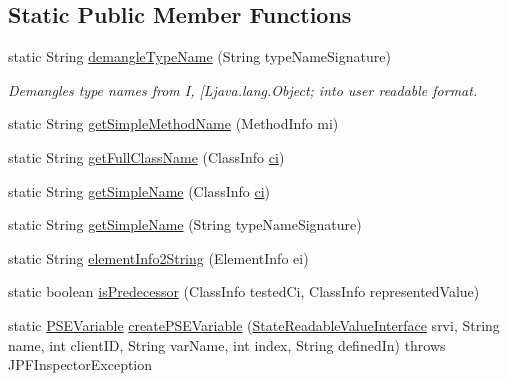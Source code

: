 \subsection*{Static Public Member Functions}
\begin{DoxyCompactItemize}
\item 
static String \hyperlink{classgov_1_1nasa_1_1jpf_1_1inspector_1_1server_1_1programstate_1_1_state_value_a4b2af88402e04430a98ebadbd98a5c67}{demangle\+Type\+Name} (String type\+Name\+Signature)
\begin{DoxyCompactList}\small\item\em Demangles type names from I, \mbox{[}Ljava.\+lang.\+Object; into user readable format. \end{DoxyCompactList}\item 
static String \hyperlink{classgov_1_1nasa_1_1jpf_1_1inspector_1_1server_1_1programstate_1_1_state_value_a7d810b593e21df3baabf5b13e473b152}{get\+Simple\+Method\+Name} (Method\+Info mi)
\item 
static String \hyperlink{classgov_1_1nasa_1_1jpf_1_1inspector_1_1server_1_1programstate_1_1_state_value_ab6efcb01d11093b4d9de33a220d0f204}{get\+Full\+Class\+Name} (Class\+Info \hyperlink{classgov_1_1nasa_1_1jpf_1_1inspector_1_1server_1_1programstate_1_1_state_value_a0eb4aa1e630ed6372dcfb8c41ae7edc5}{ci})
\item 
static String \hyperlink{classgov_1_1nasa_1_1jpf_1_1inspector_1_1server_1_1programstate_1_1_state_value_ad0fa5ab42fdeea38ce4fec44451ef680}{get\+Simple\+Name} (Class\+Info \hyperlink{classgov_1_1nasa_1_1jpf_1_1inspector_1_1server_1_1programstate_1_1_state_value_a0eb4aa1e630ed6372dcfb8c41ae7edc5}{ci})
\item 
static String \hyperlink{classgov_1_1nasa_1_1jpf_1_1inspector_1_1server_1_1programstate_1_1_state_value_a160cb94910e40bb87a81018116c92c09}{get\+Simple\+Name} (String type\+Name\+Signature)
\item 
static String \hyperlink{classgov_1_1nasa_1_1jpf_1_1inspector_1_1server_1_1programstate_1_1_state_value_aea337730b417cd995d983e1cbcff744e}{element\+Info2\+String} (Element\+Info ei)
\item 
static boolean \hyperlink{classgov_1_1nasa_1_1jpf_1_1inspector_1_1server_1_1programstate_1_1_state_value_aa23de04378976833758e7303f3d4cee6}{is\+Predecessor} (Class\+Info tested\+Ci, Class\+Info represented\+Value)
\item 
static \hyperlink{classgov_1_1nasa_1_1jpf_1_1inspector_1_1common_1_1pse_1_1_p_s_e_variable}{P\+S\+E\+Variable} \hyperlink{classgov_1_1nasa_1_1jpf_1_1inspector_1_1server_1_1programstate_1_1_state_value_a899ba1974881fe409b9b58d0ba90f3b5}{create\+P\+S\+E\+Variable} (\hyperlink{interfacegov_1_1nasa_1_1jpf_1_1inspector_1_1server_1_1programstate_1_1_state_readable_value_interface}{State\+Readable\+Value\+Interface} srvi, String name, int client\+ID, String var\+Name, int index, String defined\+In)  throws J\+P\+F\+Inspector\+Exception 

\end{DoxyCompactItemize}
